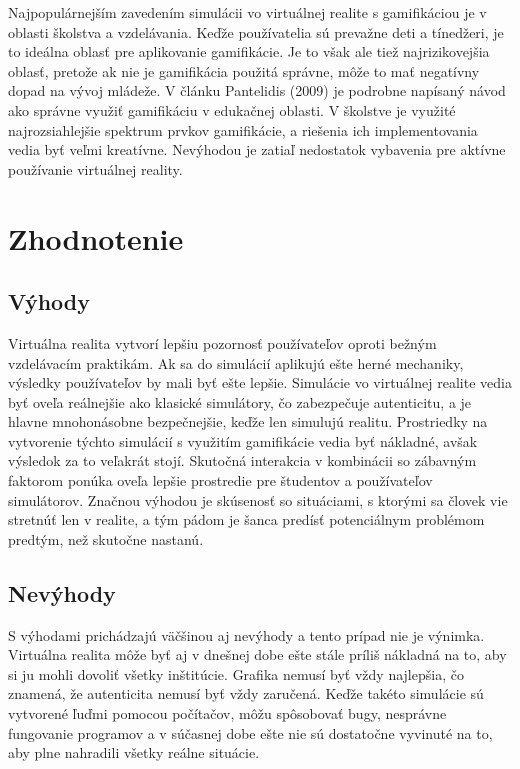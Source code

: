 \documentclass[10pt,slovak,a4paper]{article}
\begin{document}
Najpopulárnejším zavedením simulácii vo virtuálnej realite s gamifikáciou je v oblasti školstva a vzdelávania. Keďže používatelia sú prevažne deti a tínedžeri, je to ideálna oblasť pre aplikovanie gamifikácie. Je to však ale tiež najrizikovejšia oblasť, pretože ak nie je gamifikácia použitá správne, môže to mať negatívny dopad na vývoj mládeže. V článku Pantelidis (2009) \cite{Pantelidis} je podrobne napísaný návod ako správne využiť gamifikáciu v edukačnej oblasti. V školstve je využité najrozsiahlejšie spektrum prvkov gamifikácie, a riešenia ich implementovania vedia byť veľmi kreatívne. Nevýhodou je zatiaľ nedostatok vybavenia pre aktívne používanie virtuálnej reality.


\section{Zhodnotenie} \label{Zhodnotenie}

\subsection{Výhody} \label{Vyhody}

Virtuálna realita vytvorí lepšiu pozornosť používateľov oproti bežným vzdelávacím praktikám. 
Ak sa do simulácií aplikujú ešte herné mechaniky, výsledky používateľov by mali byť ešte lepšie. Simulácie vo virtuálnej realite vedia byť oveľa reálnejšie ako klasické simulátory, čo zabezpečuje autenticitu, a je hlavne mnohonásobne bezpečnejšie, keďže len simulujú realitu. Prostriedky na vytvorenie týchto simulácií s využitím gamifikácie vedia byť nákladné, avšak výsledok za to veľakrát stojí. Skutočná interakcia v kombinácii so zábavným faktorom ponúka oveľa lepšie prostredie pre študentov a používateľov simulátorov. Značnou výhodou je skúsenosť so situáciami, s ktorými sa človek vie stretnúť len v realite, a tým pádom je šanca predísť potenciálnym problémom predtým, než skutočne nastanú.
\subsection{Nevýhody} \label{Nevyhody}

S výhodami prichádzajú väčšinou aj nevýhody a tento prípad nie je výnimka. Virtuálna realita môže byť aj v dnešnej dobe ešte stále príliš nákladná na to, aby si ju mohli dovoliť všetky inštitúcie. Grafika nemusí byť vždy najlepšia, čo znamená, že autenticita nemusí byť vždy zaručená. Keďže takéto simulácie sú vytvorené ľuďmi pomocou počítačov, môžu spôsobovať bugy, nesprávne fungovanie programov a v súčasnej dobe ešte nie sú dostatočne vyvinuté na to, aby plne nahradili všetky reálne situácie.
\end{document}
